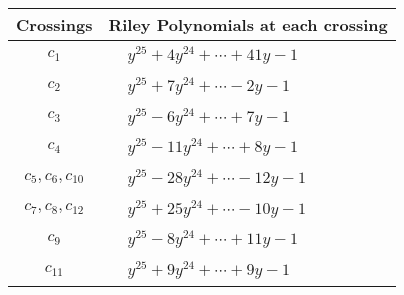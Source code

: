 \documentclass[1p]{elsarticle_modified}
\theoremstyle{definition}
\begin{document}
\begin{tabular}{m{50pt}|m{274pt}}
Crossings & \hspace{64pt}Riley Polynomials at each crossing \\
\hline $$\begin{aligned}c_{1}\end{aligned}$$&$\begin{aligned}
&y^{25}+4 y^{24}+\cdots+41 y-1
\end{aligned}$\\
\hline $$\begin{aligned}c_{2}\end{aligned}$$&$\begin{aligned}
&y^{25}+7 y^{24}+\cdots-2 y-1
\end{aligned}$\\
\hline $$\begin{aligned}c_{3}\end{aligned}$$&$\begin{aligned}
&y^{25}-6 y^{24}+\cdots+7 y-1
\end{aligned}$\\
\hline $$\begin{aligned}c_{4}\end{aligned}$$&$\begin{aligned}
&y^{25}-11 y^{24}+\cdots+8 y-1
\end{aligned}$\\
\hline $$\begin{aligned}c_{5},c_{6},c_{10}\end{aligned}$$&$\begin{aligned}
&y^{25}-28 y^{24}+\cdots-12 y-1
\end{aligned}$\\
\hline $$\begin{aligned}c_{7},c_{8},c_{12}\end{aligned}$$&$\begin{aligned}
&y^{25}+25 y^{24}+\cdots-10 y-1
\end{aligned}$\\
\hline $$\begin{aligned}c_{9}\end{aligned}$$&$\begin{aligned}
&y^{25}-8 y^{24}+\cdots+11 y-1
\end{aligned}$\\
\hline $$\begin{aligned}c_{11}\end{aligned}$$&$\begin{aligned}
&y^{25}+9 y^{24}+\cdots+9 y-1
\end{aligned}$\\
\hline
\end{tabular}\\~\\
\end{document}
